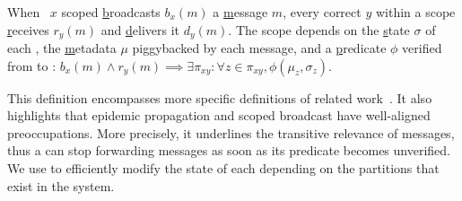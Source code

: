%


\begin{definition}
  When \Process~$x$ scoped \underline{b}roadcasts $b_x(m)$ a
  \underline{m}essage $m$, every correct \process $y$ within a scope
  \underline{r}eceives $r_y(m)$ and \underline{d}elivers it
  $d_y(m)$. The scope depends on the \underline{s}tate $\sigma$ of
  each \process, the \underline{m}etadata $\mu$ piggybacked by each
  message, and a \underline{p}redicate $\phi$ verified from \process to
  \process: $b_x(m) \wedge r_y(m) \implies \exists \pi_{xy}: \forall z
  \in \pi_{xy}, \phi(\mu_z, \sigma_z)$.
\end{definition}

This definition encompasses more specific definitions of related
work~\cite{hsiao2005scoped, lue2006scoped, wang2015prodiluvian}.  It
also highlights that epidemic propagation and scoped broadcast have
well-aligned preoccupations. More precisely, it underlines the
transitive relevance of messages, thus a \process can stop forwarding
messages as soon as its predicate becomes unverified.
%
We use \NAMEB to efficiently modify the state of each \process
depending on the partitions that exist in the system.

